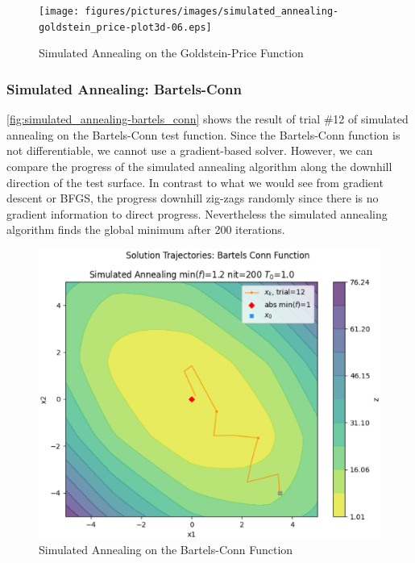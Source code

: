 \documentclass{vgtc}                          %
\begin{document}
\begin{figure}[tb]
\centering
\texttt{[image: figures/pictures/images/simulated\_annealing-goldstein\_price-plot3d-06.eps]}
\caption{Simulated Annealing on the Goldstein-Price Function}
\label{fig:simulated_annealing-goldstein_price}
\end{figure}

\subsubsection{Simulated Annealing: Bartels-Conn}

\autoref{fig:simulated_annealing-bartels_conn} shows the result of trial \#12 of simulated annealing on the Bartels-Conn test function. Since the Bartels-Conn function is not differentiable, we cannot use a gradient-based solver. However, we can compare the progress of the simulated annealing algorithm along the downhill direction of the test surface. In contrast to what we would see from gradient descent or BFGS, the progress downhill zig-zags randomly since there is no gradient information to direct progress. Nevertheless the simulated annealing algorithm finds the global minimum after 200 iterations.

\begin{figure}[tb]
\centering
\includegraphics[width=\columnwidth]{figures/pictures/images/simulated_annealing-bartels_conn-plot2d-12.eps}
\caption{Simulated Annealing on the Bartels-Conn Function}
\label{fig:simulated_annealing-bartels_conn}
\end{figure}
\end{document}
